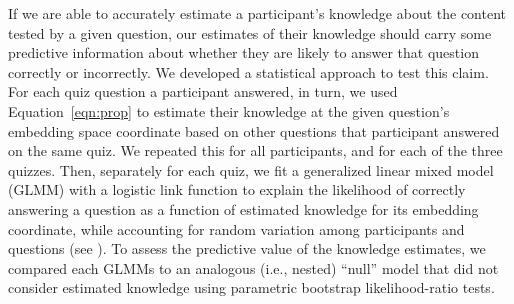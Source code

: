 \documentclass[10pt]{article}
\renewcommand{\nameref}[1]{\mbox{\textit{\oldnameref{#1}}}}
\begin{document}
If we are able to accurately estimate a participant's knowledge about the
content tested by a given question, our estimates of their knowledge should
carry some predictive information about whether they are likely to answer that 
question correctly or incorrectly. We developed a statistical approach to test this claim. 
For each quiz question a participant answered, in turn, we used Equation~\ref{eqn:prop} to estimate their knowledge at the given question's embedding space coordinate based on other questions that participant answered on the same quiz. 
We repeated this for all participants, and for each of the three quizzes. 
Then, separately for each quiz, we fit a generalized linear mixed model (GLMM) with a logistic link function to explain the likelihood of correctly answering a question as a function of estimated knowledge for its embedding coordinate, while accounting for random variation among participants and questions (see \nameref{subsec:glmm}).
To assess the predictive value of the knowledge estimates, we compared each GLMMs to an analogous (i.e., nested) ``null'' model that did not consider estimated knowledge using parametric bootstrap likelihood-ratio tests.
\end{document}
